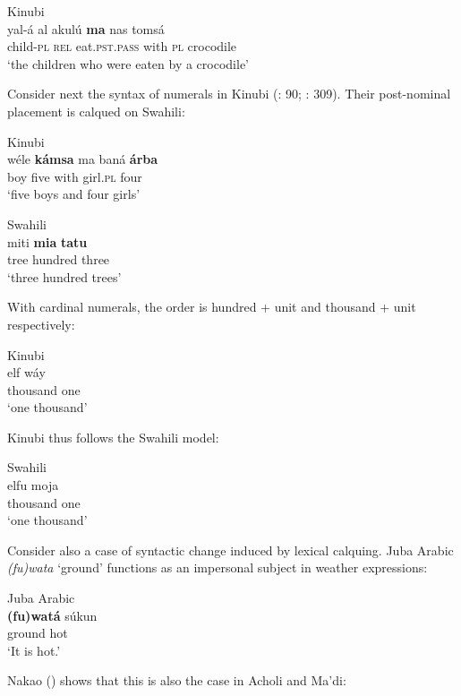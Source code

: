 \documentclass[output=paper]{langsci/langscibook}
\begin{document}
\ea
{       Kinubi \citep[230]{Luffin2005}}\\
\gll yal-á al akulú \textbf{ma} nas tomsá\\
     child-\textsc{pl} \textsc{rel} eat.\textsc{pst.pass} with \textsc{pl} crocodile\\
\glt     `the children who were eaten by a crocodile'
\z

Consider next the syntax of numerals in Kinubi (\citealt{Wellens2003}: 90; \citealt{Luffin2014}: 309). Their post-nominal placement is calqued on Swahili:

\ea
{Kinubi \citep[309]{Luffin2014}}\\
\gll wéle \textbf{kámsa} ma baná \textbf{árba}\\
     boy five with girl.\textsc{pl} four\\
\glt     `five boys and four girls'
\z

\ea
{Swahili \citep[309]{Luffin2014}}\\
\gll miti \textbf{mia} \textbf{tatu}\\
     tree hundred three\\
\glt     `three hundred trees'
\z

With cardinal numerals, the order is hundred + unit and thousand + unit respectively:

 

 \ea
{Kinubi \citep[309]{Luffin2014}}\\

\gll   elf wáy\\
       thousand one\\
\glt      `one thousand'
\z

Kinubi thus follows the Swahili model:

\ea
{Swahili \citep[309]{Luffin2014}}\\
\gll            elfu moja \\
                thousand one \\
\glt     `one thousand'
\z

Consider also a case of syntactic change induced by lexical calquing. Juba Arabic \textit{(fu)wata} ‘ground’ functions as an impersonal subject in weather expressions:

\ea
{Juba Arabic \citep[141]{Nakao2012}}\\
\gll   \textbf{(fu)watá} súkun\\
       ground hot\\
\glt     `It is hot.'
\z

Nakao (\citeyear[141]{Nakao2012}) shows that this is also the case in Acholi and Ma'di:
\end{document}
